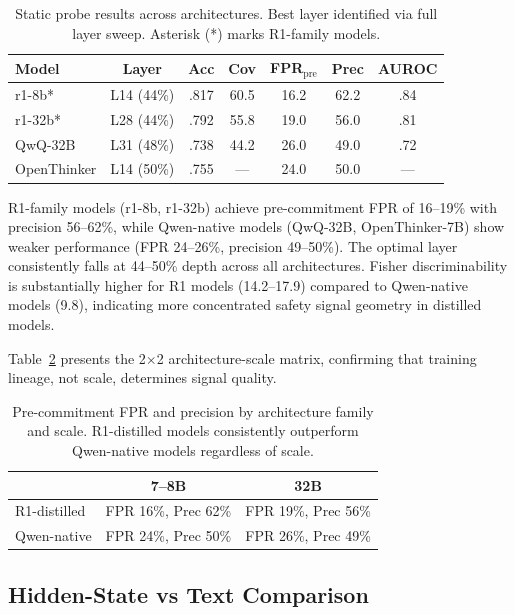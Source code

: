 \documentclass[11pt,a4paper]{article}
\begin{document}
\begin{table}[t]
\centering
\small
\caption{Static probe results across architectures. Best layer identified via full layer sweep. Asterisk (*) marks R1-family models.}
\label{tab:static}
\begin{tabular}{lcccccc}
\toprule
Model & Layer & Acc & Cov & FPR$_\text{pre}$ & Prec & AUROC \\
\midrule
r1-8b* & L14 (44\%) & .817 & 60.5 & 16.2 & 62.2 & .84 \\
r1-32b* & L28 (44\%) & .792 & 55.8 & 19.0 & 56.0 & .81 \\
QwQ-32B & L31 (48\%) & .738 & 44.2 & 26.0 & 49.0 & .72 \\
OpenThinker & L14 (50\%) & .755 & --- & 24.0 & 50.0 & --- \\
\bottomrule
\end{tabular}
\end{table}

R1-family models (r1-8b, r1-32b) achieve pre-commitment FPR of 16--19\% with precision 56--62\%, while Qwen-native models (QwQ-32B, OpenThinker-7B) show weaker performance (FPR 24--26\%, precision 49--50\%). The optimal layer consistently falls at 44--50\% depth across all architectures. Fisher discriminability is substantially higher for R1 models (14.2--17.9) compared to Qwen-native models (9.8), indicating more concentrated safety signal geometry in distilled models.

Table~\ref{tab:arch_matrix} presents the 2$\times$2 architecture-scale matrix, confirming that training lineage, not scale, determines signal quality.

\begin{table}[t]
\centering
\small
\caption{Pre-commitment FPR and precision by architecture family and scale. R1-distilled models consistently outperform Qwen-native models regardless of scale.}
\label{tab:arch_matrix}
\begin{tabular}{lcc}
\toprule
 & 7--8B & 32B \\
\midrule
R1-distilled & FPR 16\%, Prec 62\% & FPR 19\%, Prec 56\% \\
Qwen-native & FPR 24\%, Prec 50\% & FPR 26\%, Prec 49\% \\
\bottomrule
\end{tabular}
\end{table}

\subsection{Hidden-State vs Text Comparison}
\end{document}
